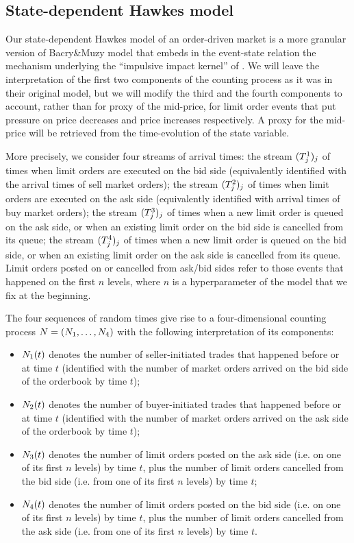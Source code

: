 \documentclass[10pt, article,table]{article}
\begin{document}
\subsection{State-dependent Hawkes model}\label{sec.sdHawkes_model}
Our state-dependent Hawkes model of an order-driven market is a more granular version of Bacry\&Muzy model that embeds in the event-state relation the mechanism underlying the ``impulsive impact kernel'' of \citealp{BM14haw}.
We will leave the interpretation of the first two components of the counting process as it was in their original model, but we will modify the third and the fourth components to account, rather than for proxy of the mid-price, for limit order events that put pressure on price decreases and price increases respectively. A proxy for the mid-price will be retrieved from the time-evolution of the state variable. 

More precisely, we consider four streams of arrival times: the stream $(\arrivalTimes[1]_j)_j$ of times when limit orders are executed on the bid side (equivalently identified with the arrival times of sell market orders); the stream  $(\arrivalTimes[2]_j)_j$ of times when limit orders are executed on the ask side (equivalently identified with arrival times of buy market orders); the stream  $(\arrivalTimes[3]_j)_j$ of times when a new limit order is queued on the ask side, or when an existing limit order on the bid side is cancelled from its queue; the stream  $(\arrivalTimes[4]_j)_j$ of times when a new limit order is queued on the bid side, or when an existing limit order on the ask side is cancelled from its queue. Limit orders posted on or cancelled from ask/bid sides refer to those events that happened on the first $n$ levels, where $n$ is a hyperparameter of the model that we fix at the beginning.

The four sequences of random times give rise to a four-dimensional counting process $\multiCountingProc=(\countingProc[1],\dots, \countingProc[4])$ with the following interpretation of its components:
\begin{itemize}
 \item $\countingProc[1](t)$ denotes the number of seller-initiated trades that happened before or at time $t$ (identified with the number of market orders arrived on the bid side of the orderbook by time $t$);
 \item $\countingProc[2](t)$ denotes the number of buyer-initiated trades that happened before or at time $t$ (identified with the number of market orders arrived on the ask side of the orderbook by time $t$);
 \item $\countingProc[3](t)$ denotes the number of limit orders posted on the ask side (i.e. on one of its first $n$ levels) by time $t$, plus the number of limit orders cancelled from the bid side (i.e. from one of its first $n$ levels) by time $t$;
 \item $\countingProc[4](t)$ denotes the number of limit orders posted on the bid side (i.e. on one of its first $n$ levels) by time $t$, plus the number of limit orders cancelled from the ask side (i.e. from one of its first $n$ levels) by time $t$.
\end{itemize}
\end{document}
